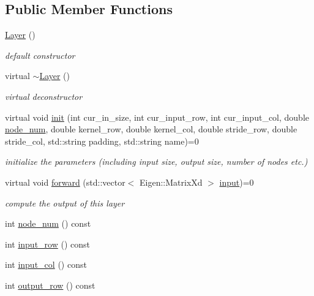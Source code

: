 \subsection*{Public Member Functions}
\begin{DoxyCompactItemize}
\item 
\hyperlink{class_layer_a8f623c7c4737dc29ecc86978d243ac6f}{Layer} ()
\begin{DoxyCompactList}\small\item\em default constructor \end{DoxyCompactList}\item 
virtual \hyperlink{class_layer_a1b1ba4804451dfe6cc357194e42762ae}{$\sim$\+Layer} ()
\begin{DoxyCompactList}\small\item\em virtual deconstructor \end{DoxyCompactList}\item 
virtual void \hyperlink{class_layer_aab662b9c8e61cd7375cbb4413d2e3037}{init} (int cur\+\_\+in\+\_\+size, int cur\+\_\+input\+\_\+row, int cur\+\_\+input\+\_\+col, double \hyperlink{class_layer_a2f19878482d098654fb084b9c21b72ed}{node\+\_\+num}, double kernel\+\_\+row, double kernel\+\_\+col, double stride\+\_\+row, double stride\+\_\+col, std\+::string padding, std\+::string name)=0
\begin{DoxyCompactList}\small\item\em initialize the parameters (including input size, output size, number of nodes etc.) \end{DoxyCompactList}\item 
virtual void \hyperlink{class_layer_ac0b116d692ea457f8e7c0f79f7159004}{forward} (std\+::vector$<$ Eigen\+::\+Matrix\+Xd $>$ \hyperlink{class_layer_a5213366d9a5a7317c5d40d9efdcfa623}{input})=0
\begin{DoxyCompactList}\small\item\em compute the output of this layer \end{DoxyCompactList}\item 
int \hyperlink{class_layer_a2f19878482d098654fb084b9c21b72ed}{node\+\_\+num} () const
\item 
int \hyperlink{class_layer_a030a6c0b038cf4c7d9125c49dd0d98bd}{input\+\_\+row} () const
\item 
int \hyperlink{class_layer_aa015026eb20766feb1256b1f1a17debc}{input\+\_\+col} () const
\item 
int \hyperlink{class_layer_a85eaa20f5bcb06e7ade031e4ae7a6a48}{output\+\_\+row} () const
\item 

\end{DoxyCompactItemize}
